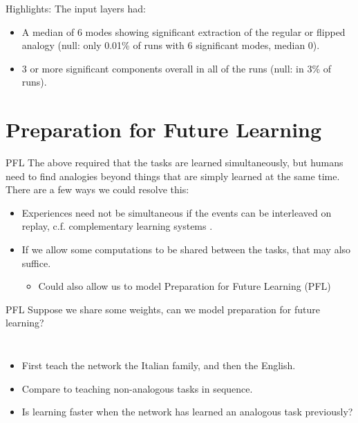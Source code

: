 \documentclass{beamer}
\begin{document}
\begin{frame}{Highlights:}
The input layers had:
\begin{itemize}
    \item<1-> A median of 6 modes showing significant extraction of the regular or flipped analogy (null: only 0.01\% of runs with 6 significant modes, median 0).
    \item<2-> 3 or more significant components overall in all of the runs (null: in 3\% of runs).
\end{itemize}
\end{frame}

\section{Preparation for Future Learning}
\begin{frame}{PFL}
The above required that the tasks are learned simultaneously, but humans need to find analogies beyond things that are simply learned at the same time. There are a few ways we could resolve this: 
\begin{itemize}
\item<2-> Experiences need not be simultaneous if the events can be interleaved on replay, c.f. complementary learning systems \cite{Kumaran2016}.
\item<3-> If we allow some computations to be shared between the tasks, that may also suffice.
\begin{itemize}
\item<4-> Could also allow us to model Preparation for Future Learning (PFL)
\end{itemize}
\end{itemize}
\end{frame}



\begin{frame}{PFL}
Suppose we share some weights, can we model preparation for future learning?\\[11pt]
\begin{columns}
    \begin{itemize}
    \item<2-> First teach the network the Italian family, and then the English.
    \item<3-> Compare to teaching non-analogous tasks in sequence. 
    \item<4-> Is learning faster when the network has learned an analogous task previously?
    \end{itemize}
\end{columns}
\end{frame}
\end{document}
